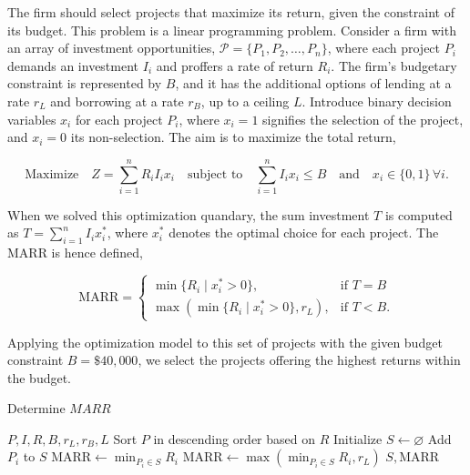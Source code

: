 \documentclass[12pt]{article}
\begin{document}
The firm should select projects that maximize its return, given the constraint of its budget. This problem is a linear programming problem. Consider a firm with an array of investment opportunities, \( \mathcal{P} = \{ P_1, P_2, \ldots, P_n \} \), where each project \( P_i \) demands an investment \( I_i \) and proffers a rate of return \( R_i \). The firm's budgetary constraint is represented by \( B \), and it has the additional options of lending at a rate \( r_L \) and borrowing at a rate \( r_B \), up to a ceiling \( L \). Introduce binary decision variables \( x_i \) for each project \( P_i \), where \( x_i = 1 \) signifies the selection of the project, and \( x_i = 0 \) its non-selection. The aim is to maximize the total return,

\[
\text{Maximize} \quad Z = \sum_{i=1}^{n} R_i I_i x_i \quad \text{subject to} \quad \sum_{i=1}^{n} I_i x_i \leq B \quad \text{and} \quad x_i \in \{0, 1\} \, \forall i.
\]

When we solved this optimization quandary, the sum investment \( T \) is computed as \( T = \sum_{i=1}^{n} I_i x_i^* \), where \( x_i^* \) denotes the optimal choice for each project. The MARR is hence defined,

\[
\text{MARR} = 
\begin{cases} 
\min \{ R_i \mid x_i^* > 0 \}, & \text{if } T = B \\
\max(\min \{ R_i \mid x_i^* > 0 \}, r_L), & \text{if } T < B.
\end{cases}
\]

Applying the optimization model to this set of projects with the given budget constraint \( B = \$40,000 \), we select the projects offering the highest returns within the budget.

\begin{center}
\begin{algorithm}
\caption{Determine \(MARR\)}
\begin{algorithmic}[1]
\Require $P, I, R, B, r_L, r_B, L$
\State Sort $P$ in descending order based on $R$
\State Initialize $S \gets \varnothing$
        \State Add $P_i$ to $S$
    \EndIf
\EndFor
{}
    \State $\text{MARR} \gets \min_{P_i \in S} R_i$
    \State $\text{MARR} \gets \max(\min_{P_i \in S} R_i, r_L)$
\EndIf
\Ensure $S, \text{MARR}$
\end{algorithmic}
\end{algorithm}
\end{center}
\end{document}
